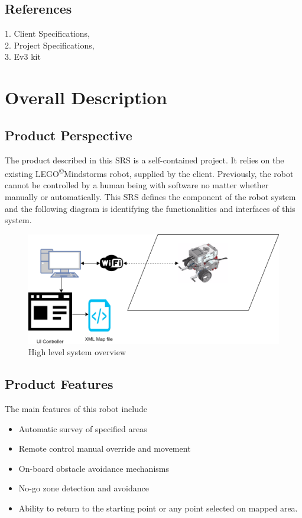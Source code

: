 \documentclass[10pt,a4paper,titlepage]{article}
\newcommand{\cpright}{\textsuperscript{\tiny\copyright}}
\begin{document}
	\subsection{References}
	1. Client Specifications, \\
	2. Project Specifications, \\
	3. Ev3 kit
	
	\section{Overall Description}
	\subsection{Product Perspective}
	The product described in this SRS is a self-contained project. It relies on the existing LEGO\cpright Mindstorms robot, supplied by the client. Previously, the robot cannot be controlled by a human being with software no matter whether manually or automatically. This SRS defines the component of the robot system and the following diagram is identifying the functionalities and interfaces of this system.
	
	\begin{figure}[H]
		\includegraphics[width=\linewidth]{Robot_system.png}  %
		\caption{High level system overview}
		\label{fig:system overview}				
	\end{figure}
	
	\subsection{Product Features}
	The main features of this robot include
	\begin{itemize}
		\item Automatic survey of specified areas
		\item Remote control manual override and movement
		\item On-board obstacle avoidance mechanisms 
		\item No-go zone detection and avoidance
		\item Ability to return to the starting point or any point selected on mapped area.
	\end{itemize}
	
\end{document}
